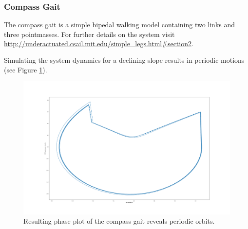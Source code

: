 \subsubsection{Compass Gait}
The compass gait is a simple bipedal walking model containing two links and three pointmasses. For further details on the system visit \url{http://underactuated.csail.mit.edu/simple_legs.html#section2}. 

Simulating the system dynamics for a declining slope results in periodic motions (see Figure \ref{fig:compassGait}).
\begin{figure}[h!]
\centering
\includegraphics[width=1\linewidth]{Media/Drake/ExSimpleWalking/CompassGait_PhasePlot.png}
\caption{Resulting phase plot of the compass gait reveals periodic orbits.}
\label{fig:compassGait}
\end{figure}


